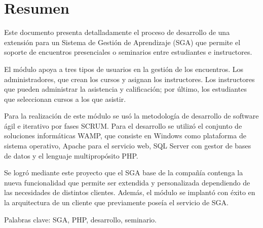 ﻿\chapter*{Resumen}

Este documento presenta detalladamente el proceso de desarrollo de una extensión para un Sistema de Gestión de Aprendizaje (SGA) que permite el soporte de encuentros presenciales o seminarios entre estudiantes e instructores. 

El módulo apoya a tres tipos de usuarios en la gestión de los encuentros. Los administradores, que crean los cursos y asignan los instructores. Los instructores que pueden administrar la asistencia y calificación; por último, los estudiantes que seleccionan cursos a los que asistir.

Para la realización de este módulo se usó la metodología de desarrollo de software ágil e iterativo por fases SCRUM. Para el desarrollo se utilizó el conjunto de soluciones informáticas WAMP, que consiste en Windows como plataforma de sistema operativo, Apache para el servicio web, SQL Server con gestor de bases de datos y el lenguaje multipropósito PHP.

Se logró mediante este proyecto que el SGA base de la compañía contenga la nueva funcionalidad que permite ser extendida y personalizada dependiendo de las necesidades de distintos clientes. Además, el módulo se implantó con éxito en la arquitectura de un cliente que previamente poseía el servicio de SGA.

Palabras clave: SGA, PHP, desarrollo, seminario.





